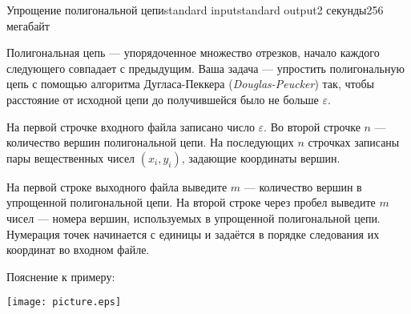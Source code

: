 \begin{problem}{Упрощение полигональной цепи}{standard input}{standard output}{2 секунды}{256 мегабайт}

Полигональная цепь — упорядоченное множество отрезков, начало каждого следующего совпадает с предыдущим.
Ваша задача — упростить полигональную цепь с помощью алгоритма Дугласа-Пеккера (\emph{Douglas-Peucker}) так,
чтобы расстояние от исходной цепи до получившейся было не больше $\varepsilon$.


\InputFile

На первой строчке входного файла записано число $\varepsilon$.
Во второй строчке $n$ — количество вершин полигональной цепи.
На последующих $n$ строчках записаны пары вещественных чисел $(x_i, y_i)$, задающие координаты вершин.

\OutputFile

На первой строке выходного файла выведите $m$ — количество вершин в упрощенной полигональной цепи.
На второй строке через пробел выведите $m$ чисел — номера вершин, используемых в упрощенной полигональной цепи.
Нумерация точек начинается с единицы и задаётся в порядке следования их координат во входном файле.

\Examples

\begin{example}%
%
\end{example}
\Note
Пояснение к примеру:
	\begin{center}
		\texttt{[image: picture.eps]}
	\end{center}
\end{problem}